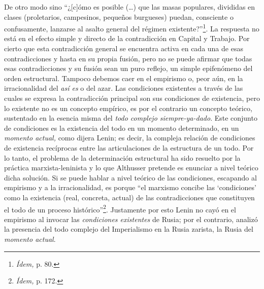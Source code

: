 De otro modo sino \enquote{¿{[}c{]}ómo es posible (\dots) que las masas populares, divididas en clases (proletarios, campesinos, pequeños burgueses) puedan, consciente o confusamente, lanzarse al asalto general del régimen existente?}\footnote{\emph{Ídem,} p. 80.}. La respuesta no está en el efecto simple y directo de la contradicción en Capital y Trabajo. Por cierto que esta contradicción general se encuentra activa en cada una de esas contradicciones y hasta en su propia fusión, pero no se puede afirmar que todas esas contradicciones y su fusión sean un puro reflejo, un simple epifenómeno del orden estructural. Tampoco debemos caer en el empirismo o, peor aún, en la irracionalidad del \emph{así es} o del azar. Las condiciones existentes a través de las cuales se expresa la contradicción principal son sus condiciones de existencia, pero lo existente no es un concepto empírico, es por el contrario un concepto teórico, sustentado en la esencia misma del \emph{todo complejo siempre-ya-dado}. Este conjunto de condiciones es la existencia del todo en un momento determinado, en un \emph{momento actual,} como dijera Lenin; es decir, la compleja relación de condiciones de existencia recíprocas entre las articulaciones de la estructura de un todo. Por lo tanto, el problema de la determinación estructural ha sido resuelto por la práctica marxista-leninista y lo que Althusser pretende es enunciar a nivel teórico dicha solución. Si se puede hablar a nivel teórico de las condiciones, escapando al empirismo y a la irracionalidad, es porque \enquote{el marxismo concibe las \enquote{condiciones} como la existencia (real, concreta, actual) de las contradicciones que constituyen el todo de un proceso histórico}\footnote{\emph{Ídem,} p. 172.}. Justamente por esto Lenin no cayó en el empirismo al invocar las \emph{condiciones existentes} de Rusia; por el contrario, analizó la presencia del todo complejo del Imperialismo en la Rusia zarista, la Rusia del \emph{momento actual}.

